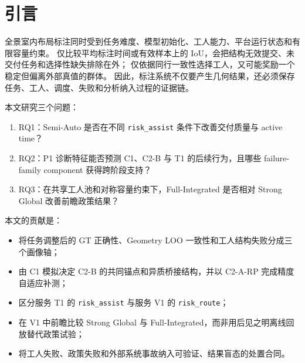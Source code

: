 \section{引言}

全景室内布局标注同时受到任务难度、模型初始化、工人能力、平台运行状态和有限容量约束。
仅比较平均标注时间或有效样本上的 IoU，会把结构无效提交、未交付任务和选择性缺失排除在外；
仅依据同行一致性选择工人，又可能奖励一个稳定但偏离外部真值的群体。
因此，标注系统不仅要产生几何结果，还必须保存任务、工人、调度、失败和分析纳入过程的证据链。

本文研究三个问题：
\begin{enumerate}
  \item RQ1：Semi-Auto 是否在不同 \texttt{risk\_assist} 条件下改善交付质量与 active time？
  \item RQ2：P1 诊断特征能否预测 C1、C2-B 与 T1 的后续行为，且哪些 failure-family component 获得跨阶段支持？
  \item RQ3：在共享工人池和对称容量约束下，Full-Integrated 是否相对 Strong Global 改善前瞻政策结果？
\end{enumerate}

本文的贡献是：
\begin{itemize}
  \item 将任务调整后的 GT 正确性、Geometry LOO 一致性和工人结构失败分成三个画像轴；
  \item 由 C1 模拟决定 C2-B 的共同锚点和异质桥接结构，并以 C2-A-RP 完成精度自适应补测；
  \item 区分服务 T1 的 \texttt{risk\_assist} 与服务 V1 的 \texttt{risk\_route}；
  \item 在 V1 中前瞻比较 Strong Global 与 Full-Integrated，而非用后见之明离线回放替代政策试验；
  \item 将工人失败、政策失败和外部系统事故纳入可验证、结果盲态的处置合同。
\end{itemize}

